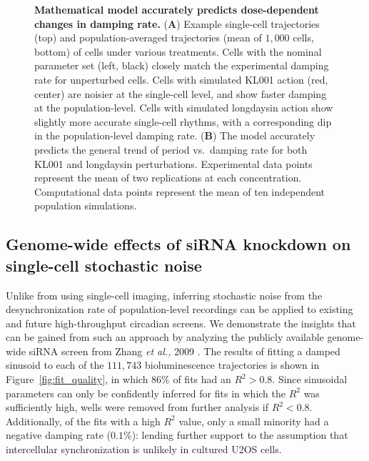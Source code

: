 \documentclass[11pt, letterpaper]{article}
\begin{document}
\begin{figure}[tbp]
  \begin{center}
  \end{center}
  \caption{{\bfseries Mathematical model accurately predicts dose-dependent changes in damping rate.}
({\bfseries A}) Example single-cell trajectories (top) and population-averaged trajectories (mean of $1,000$ cells, bottom) of cells under various treatments. Cells with the nominal parameter set (left, black) closely match the experimental damping rate for unperturbed cells. Cells with simulated KL001 action (red, center) are noisier at the single-cell level, and show faster damping at the population-level. Cells with simulated longdaysin action show slightly more accurate single-cell rhythms, with a corresponding dip in the population-level damping rate.
({\bfseries B}) The model accurately predicts the general trend of period vs.\ damping rate for both KL001 and longdaysin perturbations. Experimental data points represent the mean of two replications at each concentration. Computational data points represent the mean of ten independent population simulations.}
\label{fig:simulation}
\end{figure}


\subsection*{Genome-wide effects of siRNA knockdown on single-cell stochastic noise}

Unlike from using single-cell imaging, inferring stochastic noise from the desynchronization rate of population-level recordings can be applied to existing and future high-throughput circadian screens.
We demonstrate the insights that can be gained from such an approach by analyzing the publicly available genome-wide siRNA screen from Zhang {\itshape et al.,} 2009 \cite{Zhang2009}.
The results of fitting a damped sinusoid to each of the $111,743$ bioluminescence trajectories is shown in Figure~\ref{fig:fit_quality}, in which $86\%$ of fits had an $R^2 > 0.8$.
Since sinusoidal parameters can only be confidently inferred for fits in which the $R^2$ was sufficiently high, wells were removed from further analysis if $R^2 < 0.8$.
Additionally, of the fits with a high $R^2$ value, only a small minority had a negative damping rate ($0.1\%$): lending further support to the assumption that intercellular synchronization is unlikely in cultured U2OS cells. 
\end{document}
